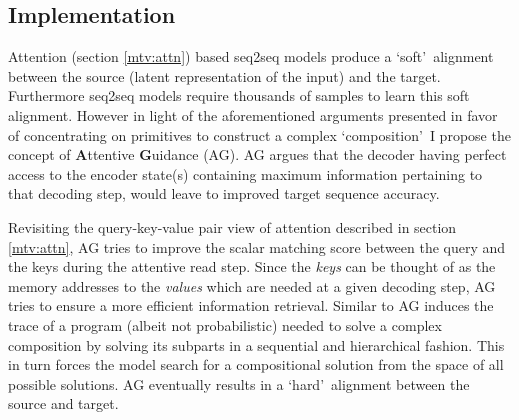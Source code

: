 \subsection{Implementation}

Attention (section \ref{mtv:attn}) based seq2seq models produce a \lq soft{}\rq\ alignment between the source (latent representation of the input) and the target. Furthermore seq2seq models require thousands of samples to learn this soft alignment. However in light of the aforementioned arguments presented in favor of concentrating on primitives to construct a complex \lq composition{}\rq\ I propose the concept of \textbf{A}ttentive \textbf{G}uidance (AG). AG argues that the decoder having perfect access to the encoder state(s) containing maximum information pertaining to that decoding step, would leave to improved target sequence accuracy.


Revisiting the query-key-value pair view of attention described in section \ref{mtv:attn}, AG tries to improve the scalar matching score between the query and the keys during the attentive read step. Since the \textit{keys} can be thought of as the memory addresses to the \textit{values} which are needed at a given decoding step, AG tries to ensure a more efficient information retrieval. Similar to \cite{Lake2015} AG induces the trace of a program (albeit not probabilistic) needed to solve a complex composition by solving its subparts in a sequential and hierarchical fashion. This in turn forces the model search for a compositional solution from the space of all possible solutions. AG eventually results in a \lq hard{}\rq\ alignment between the source and target.


